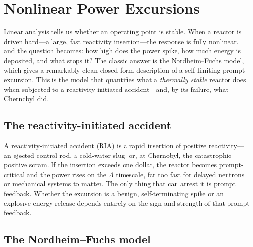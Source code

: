 \chapter{Nonlinear Power Excursions}
\label{ch:nonlinear}

Linear analysis tells us whether an operating point is stable. When a reactor is
driven hard---a large, fast reactivity insertion---the response is fully
nonlinear, and the question becomes: how high does the power spike, how much
energy is deposited, and what stops it? The classic answer is the
Nordheim--Fuchs model, which gives a remarkably clean closed-form description of a
self-limiting prompt excursion. This is the model that quantifies what a
\emph{thermally stable} reactor does when subjected to a reactivity-initiated
accident---and, by its failure, what Chernobyl did.

\section{The reactivity-initiated accident}

A reactivity-initiated accident (RIA) is a rapid insertion of positive
reactivity---an ejected control rod, a cold-water slug, or, at Chernobyl, the
catastrophic positive scram. If the insertion exceeds one dollar, the reactor
becomes prompt-critical and the power rises on the $\Lambda$ timescale, far too
fast for delayed neutrons or mechanical systems to matter. The only thing that can
arrest it is prompt feedback. Whether the excursion is a benign, self-terminating
spike or an explosive energy release depends entirely on the sign and strength of
that prompt feedback.

\section{The Nordheim--Fuchs model}

